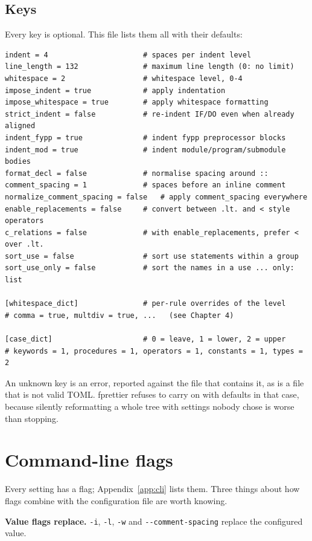 \documentclass[11pt,a4paper,openany]{book}
\newcommand{\code}[1]{\texttt{\small #1}}
\newcommand{\flag}[1]{\texttt{\small -{}-#1}}
\begin{document}
\subsection{Keys}

Every key is optional. This file lists them all with their defaults:

\begin{lstlisting}[style=toml]
indent = 4                      # spaces per indent level
line_length = 132               # maximum line length (0: no limit)
whitespace = 2                  # whitespace level, 0-4
impose_indent = true            # apply indentation
impose_whitespace = true        # apply whitespace formatting
strict_indent = false           # re-indent IF/DO even when already aligned
indent_fypp = true              # indent fypp preprocessor blocks
indent_mod = true               # indent module/program/submodule bodies
format_decl = false             # normalise spacing around ::
comment_spacing = 1             # spaces before an inline comment
normalize_comment_spacing = false   # apply comment_spacing everywhere
enable_replacements = false     # convert between .lt. and < style operators
c_relations = false             # with enable_replacements, prefer < over .lt.
sort_use = false                # sort use statements within a group
sort_use_only = false           # sort the names in a use ... only: list

[whitespace_dict]               # per-rule overrides of the level
# comma = true, multdiv = true, ...   (see Chapter 4)

[case_dict]                     # 0 = leave, 1 = lower, 2 = upper
# keywords = 1, procedures = 1, operators = 1, constants = 1, types = 2
\end{lstlisting}

An unknown key is an error, reported against the file that contains it, as is a
file that is not valid TOML. fprettier refuses to carry on with defaults in that
case, because silently reformatting a whole tree with settings nobody chose is
worse than stopping.

\section{Command-line flags}

Every setting has a flag; Appendix~\ref{app:cli} lists them. Three things about
how flags combine with the configuration file are worth knowing.

\textbf{Value flags replace.} \code{-i}, \code{-l}, \code{-w} and
\flag{comment-spacing} replace the configured value.
\end{document}
